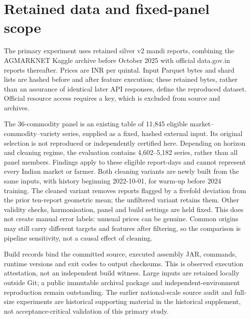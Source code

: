 \section{Retained data and fixed-panel scope}\label{sec:data}
The primary experiment uses retained silver v2 mandi reports, combining the AGMARKNET Kaggle archive before October 2025 with official data.gov.in reports thereafter. Prices are INR per quintal. Input Parquet bytes and shard lists are hashed before and after feature execution; these retained bytes, rather than an assurance of identical later API responses, define the reproduced dataset. Official resource access requires a key, which is excluded from source and archives.

The 36-commodity panel is an existing table of 11,845 eligible market--commodity--variety series, supplied as a fixed, hashed external input. Its original selection is not reproduced or independently certified here. Depending on horizon and cleaning regime, the evaluation contains 4,602--5,182 series, rather than all panel members. Findings apply to these eligible report-days and cannot represent every Indian market or farmer.
Both cleaning variants are newly built from the same inputs, with history beginning 2022-10-01, for warm-up before 2024 training. The cleaned variant removes reports flagged by a fivefold deviation from the prior ten-report geometric mean; the unfiltered variant retains them. Other validity checks, harmonisation, panel and build settings are held fixed. This does not create manual error labels: unusual prices can be genuine. Common origins may still carry different targets and features after filtering, so the comparison is pipeline sensitivity, not a causal effect of cleaning.

Build records bind the committed source, executed assembly JAR, commands, runtime versions and exit codes to output checksums. This is observed execution attestation, not an independent build witness. Large inputs are retained locally outside Git; a public immutable archival package and independent-environment reproduction remain outstanding. The earlier national-scale source audit and full-size experiments are historical supporting material in the historical supplement, not acceptance-critical validation of this primary study.
